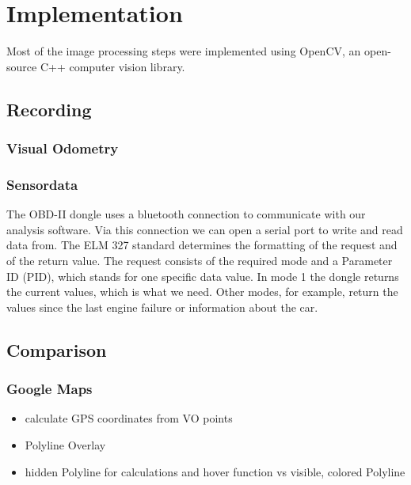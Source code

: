 \section{Implementation}
\label{sec:implementation}

Most of the image processing steps were implemented using OpenCV, an open-source C++ computer vision library. 

\subsection{Recording}
\subsubsection{Visual Odometry}
\subsubsection{Sensordata}
The OBD-II dongle uses a bluetooth connection to communicate with our analysis software. Via this connection we can open a serial port to write and read data from.
The ELM 327 standard determines the formatting of the request and of the return value.
The request consists of the required mode and a Parameter ID (PID), which stands for one specific data value. In mode 1 the dongle returns the current values, which is what we need. Other modes, for example, return the values since the last engine failure or information about the car.


\subsection{Comparison}
\subsubsection{Google Maps}
\begin{itemize}
	\item calculate GPS coordinates from VO points
	\item Polyline Overlay
	\item hidden Polyline for calculations and hover function vs visible, colored Polyline	
\end{itemize}